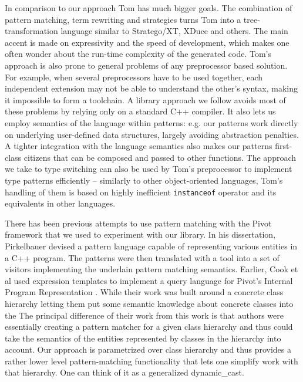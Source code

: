 \documentclass[preprint]{sigplanconf}
\makeatletter
\DeclareRobustCommand{\code}[1]{{\lstinline[breaklines=false,escapechar=@]{#1}}}
\makeatother
\begin{document}
In comparison to our approach Tom has much bigger goals. The combination of 
pattern matching, term rewriting and strategies turns Tom into a 
tree-transformation language similar to Stratego/XT, XDuce and others. 
The main accent is made on expressivity and the speed of development, which 
makes one often wonder about the run-time complexity of the generated code.
Tom's approach is also prone to general problems of any preprocessor based 
solution\cite[]{SELL}. For example, when several preprocessors 
have to be used together, each independent extension may not be able to 
understand the other's syntax, making it impossible to form a toolchain.
A library approach we follow avoids most of these problems by relying only on a 
standard C++ compiler. It also lets us employ semantics of the language within 
patterns: e.g. our patterns work directly on underlying user-defined data 
structures, largely avoiding abstraction penalties. A tighter integration with 
the language semantics also makes our patterns first-class citizens that can be 
composed and passed to other functions. The approach we take to type switching 
can also be used by Tom's preprocessor to implement type patterns efficiently -- 
similarly to other object-oriented languages, Tom's handling of them is based on 
highly inefficient \code{instanceof} operator and its equivalents in other 
languages.


There has been previous attempts to use pattern matching with the Pivot 
framework that we used to experiment with our library. In his dissertation, 
Pirkelbauer devised a pattern language capable of representing various entities 
in a C++ program. The patterns were then translated with a tool into a set of 
visitors implementing the underlain pattern matching 
semantics\cite{PirkelbauerThesis}. Earlier, Cook et al used expression templates 
to implement a query language for Pivot's Internal Program Representation 
\cite{iql04}. While their work was built around a concrete class hierarchy 
letting them put some semantic knowledge about concrete classes into the 
The principal difference of their work from this work is that 
authors were essentially creating a pattern matcher for a given class hierarchy 
and thus could take the semantics of the entities represented by classes in the 
hierarchy into account. Our approach is parametrized over class hierarchy and 
thus provides a rather lower level pattern-matching functionality that lets one 
simplify work with that hierarchy.  One can think of it as a generalized 
dynamic\_cast.
\end{document}
